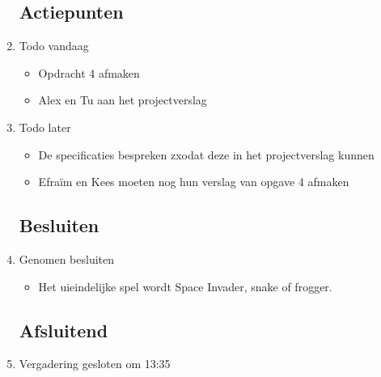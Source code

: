 \documentclass{article}
\begin{document}
\begin{enumerate}
	\subsection*{Actiepunten}
	\item Todo vandaag
	\begin{itemize}
		\item Opdracht 4 afmaken
		\item Alex en Tu aan het projectverslag
	\end{itemize}
	\item Todo later
	\begin{itemize}
		\item De specificaties bespreken zxodat deze in het projectverslag kunnen
		\item Efraïm en Kees moeten nog hun verslag van opgave 4 afmaken
	\end{itemize}

	\subsection*{Besluiten}
	\item Genomen besluiten
	\begin{itemize}
		\item Het uieindelijke spel wordt Space Invader, snake of frogger.
	\end{itemize}

	\noindent 
	\subsection*{Afsluitend}
	\item Vergadering gesloten om 13:35%

\end{enumerate}
\end{document}
